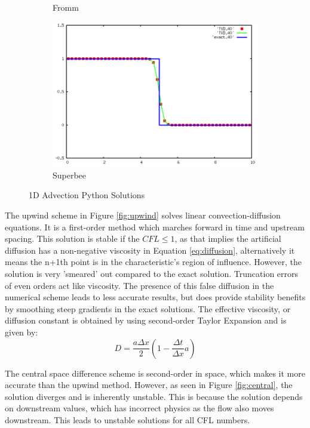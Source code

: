 \documentclass[12pt, a4paper]{article}
\begin{document}
\begin{figure}[H]
\begin{subfigure}[b]{0.48\textwidth}
		\caption{Fromm}
		\label{fig:fromm}
	\end{subfigure}
	\hfill
	\begin{subfigure}[b]{0.48\textwidth}
		\centering
		\includegraphics[width=\textwidth]{python/superbee}
		\caption{Superbee}
		\label{fig:superbee}
	\end{subfigure}
	\caption{1D Advection Python Solutions}
	\label{fig:advection}
\end{figure}

The upwind scheme in Figure \ref{fig:upwind} solves linear convection-diffusion equations. It is a first-order method which marches forward in time and upstream spacing. This solution is stable if the $CFL\le1$, as that implies the artificial diffusion has a non-negative viscosity in Equation \ref{eq:diffusion}, alternatively it means the n+1th point is in the characteristic's region of influence. However, the solution is very 'smeared' out compared to the exact solution. Truncation errors of even orders act like viscosity. The presence of this false diffusion in the numerical scheme leads to less accurate results, but does provide stability benefits by smoothing steep gradients in the exact solutions. The effective viscosity, or diffusion constant is obtained by using second-order Taylor Expansion and is given by:
\begin{equation}\label{eq:diffusion}
	D=\dfrac{a\Delta x}{2}(1-\dfrac{\Delta t}{\Delta x}a)
\end{equation}

The central space difference scheme is second-order in space, which makes it more accurate than the upwind method. However, as seen in Figure \ref{fig:central}, the solution diverges and is inherently unstable. This is because the solution depends on downstream values, which has incorrect physics as the flow also moves downstream. This leads to unstable solutions for all CFL numbers.
\end{document}
